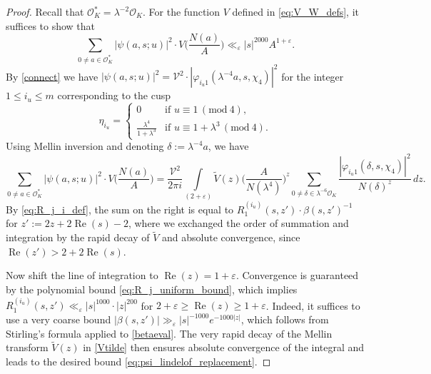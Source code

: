 \documentclass[12pt,reqno]{amsart}
\numberwithin{equation}{section}
\renewcommand{\Re}{\operatorname{Re}}
\renewcommand{\pmod}[1]{\, (\mathrm{mod}\ #1)}
\begin{document}
\begin{proof}
    Recall that $\mathcal{O}_K^* = \lambda^{-2} \mathcal{O}_K$. For the function $V$ defined in \eqref{eq:V_W_defs}, it suffices to show that
    \begin{equation} \label{eq:psi_lindelof_replacement}
        \sum_{0 \neq a \in \mathcal{O}^*_K} |\psi(a, s; u)|^2 \cdot V \Big(\frac{N(a)}{A}\Big) \ll_{\varepsilon} |{s}|^{2000} A^{1+\varepsilon}.
    \end{equation}
    By \eqref{connect} we have $|\psi(a, s; u)|^2 = \mathcal{V}^{2}\cdot |\varphi_{i_u 1}(\lambda^{-4} a, s, \chi_4)|^2$ for the integer $1 \leq i_u \leq m$ corresponding to the cusp
    \begin{equation}\label{eq:i_u_cusp_def}
        \eta_{i_u} = \begin{cases}
            0 & \text{if } u \equiv 1 \pmod{4},\\
            \frac{\lambda^4}{1+\lambda^3} & \text{if } u \equiv 1 + \lambda^3 \pmod{4}.
        \end{cases}
    \end{equation}
    Using Mellin inversion and denoting $\delta := \lambda^{-4}a$, we have
    \begin{equation*}
        \sum_{0 \neq a \in \mathcal{O}^*_K} |\psi(a, s; u)|^2 \cdot V\Big(\frac{N(a)}{A}\Big) = \frac{\mathcal{V}^{2}}{2\pi i} \int\limits_{(2 + \varepsilon)} \widetilde{V}(z)  \Big(\frac{A}{N(\lambda^4)}\Big)^{z} \sum_{0 \neq \delta \in \lambda^{-6} \mathcal{O}_K} \frac{|\varphi_{i_u 1}(\delta, s, \chi_4)|^2}{N(\delta)^z} \, dz.
    \end{equation*}
    By \eqref{eq:R_j_i_def}, the sum on the right is equal to $R_{1}^{(i_u)}(s, z') \cdot \beta(s, z')^{-1}$ for $z' := 2z + 2\Re(s) - 2$, where we exchanged the order of summation and integration by the rapid decay of $\widetilde{V}$ and absolute convergence, since $\Re(z') > 2 + 2\Re(s)$.

    Now shift the line of integration to $\Re(z) = 1+\varepsilon$. Convergence is guaranteed by the polynomial bound \eqref{eq:R_j_uniform_bound}, which implies $R_1^{(i_u)}(s, z') \ll_{\varepsilon} |{s}|^{1000} \cdot |{z}|^{200}$ for $2 + \varepsilon \geq \Re(z) \geq 1+\varepsilon$. Indeed, it suffices to use a very coarse bound $|{\beta(s, z')}| \gg_\varepsilon |{s}|^{-1000} e^{-1000 |{z}|}$, which follows from Stirling's formula applied to \eqref{betaeval}. The very rapid decay of the Mellin transform $\widetilde{V}(z)$ in \eqref{Vtilde} then ensures absolute convergence of the integral and leads to the desired bound \eqref{eq:psi_lindelof_replacement}. 
\end{proof}
\end{document}
